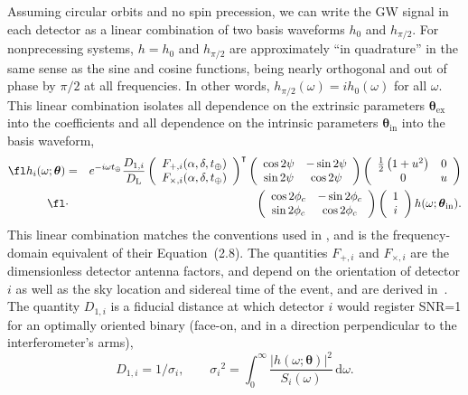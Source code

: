 \documentclass{iopart}
\begin{document}
Assuming circular orbits and no spin precession, we can write the \ac{GW} signal in each detector as a linear combination of two basis waveforms $h_0$ and $h_{\pi/2}$. For nonprecessing systems, $h = h_0$ and $h_{\pi/2}$ are approximately ``in quadrature'' in the same sense as the sine and cosine functions, being nearly orthogonal and out of phase by ${\pi/2}$ at all frequencies. In other words, $h_{\pi/2}(\omega) = i h_0(\omega)$ for all $\omega$. This linear combination isolates all dependence on the extrinsic parameters $\boldsymbol\theta_\mathrm{ex}$ into the coefficients and all dependence on the intrinsic parameters $\boldsymbol\theta_\mathrm{in}$ into the basis waveform,
%
\begin{eqnarray}\label{eq:full-signal-model}
	\fl h_i(\omega; \boldsymbol\theta) &=& e^{-i\omega t_\oplus}\frac{D_{1,i}}{D_\mathrm{L}}
	\left(\begin{array}{cc}
		F_{+,i}(\alpha, \delta, t_\oplus) \\
		F_{\times,i}(\alpha, \delta, t_\oplus)
	\end{array}\right)^\intercal
	\left(\begin{array}{cc}
		\cos{2\psi} & -\sin{2\psi} \\
		\sin{2\psi} & \cos{2\psi}
	\end{array}\right)
	\left(\begin{array}{cc}
		\frac{1}{2}\left(1+u^2\right) & 0 \\
		0 & u
	\end{array}\right) \nonumber\\\fl &\cdot&
	\left(\begin{array}{cc}
		\cos{2\phi_c} & -\sin{2\phi_c} \\
		\sin{2\phi_c} & \cos{2\phi_c}
	\end{array}\right)
	\left(\begin{array}{cc}
		1 \\
		i
	\end{array}\right) h(\omega; \boldsymbol\theta_\mathrm{in}).
\end{eqnarray}
%
This linear combination matches the conventions used in \cite{PhysRevD.83.084002}, and is the frequency-domain equivalent of their Equation~(2.8). The quantities $F_{+,i}$ and $F_{\times,i}$ are the dimensionless detector antenna factors, and depend on the orientation of detector $i$ as well as the sky location and sidereal time of the event, and are derived in~\cite{PhysRevD.63.042003}. The quantity $D_{1,i}$ is a fiducial distance at which detector $i$ would register SNR=1 for an optimally oriented binary (face\nobreakdashes-on, and in a direction perpendicular to the interferometer's arms),
%
\begin{equation}\label{eq:horizon}
D_{1,i} = 1 / \sigma_i, \qquad {\sigma_i}^2 = \int_0^\infty \frac{\left|h(\omega; \mathbf \theta)\right|^2}{S_i(\omega)} \,\mathrm{d}\omega.
\end{equation}
\end{document}
